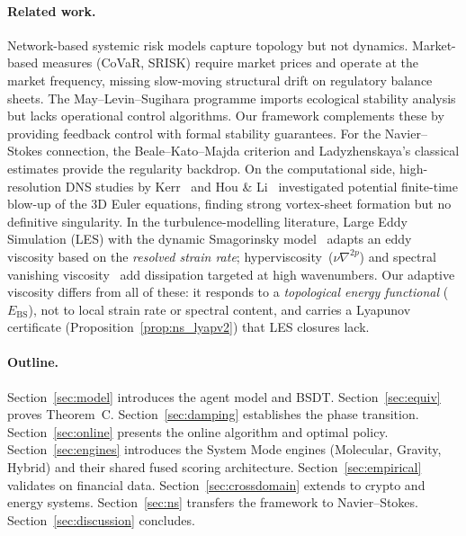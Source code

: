 \documentclass[final]{siamltex}
\begin{document}
\paragraph{Related work.}
Network-based systemic risk models
\cite{acemoglu2015systemic,elliott2014financial} capture topology
but not dynamics. Market-based measures (CoVaR, SRISK) require
market prices and operate at the market frequency, missing
slow-moving structural drift on regulatory balance sheets.
The May--Levin--Sugihara programme \cite{may2008complex} imports
ecological stability analysis but lacks operational control
algorithms. Our framework complements these by providing feedback
control with formal stability guarantees. For the Navier--Stokes
connection, the Beale--Kato--Majda criterion \cite{bkm1984} and
Ladyzhenskaya's classical estimates \cite{lady1969} provide the
regularity backdrop.  On the computational side, high-resolution
DNS studies by Kerr~\cite{kerr1993} and Hou \&
Li~\cite{houli2006} investigated potential finite-time blow-up of
the 3D Euler equations, finding strong vortex-sheet formation but
no definitive singularity.  In the turbulence-modelling
literature, Large Eddy Simulation (LES) with the dynamic
Smagorinsky model~\cite{smagorinsky1963,germano1991} adapts an
eddy viscosity based on the \emph{resolved strain rate};
hyperviscosity~($\nu\nabla^{2p}$) and spectral vanishing
viscosity~\cite{tadmor1989} add dissipation targeted at high
wavenumbers.  Our adaptive viscosity differs from all of these:
it responds to a \emph{topological energy functional}
($E_{\mathrm{BS}}$), not to local strain rate or spectral
content, and carries a Lyapunov certificate
(Proposition~\ref{prop:ns_lyapv2}) that LES closures lack.

\paragraph{Outline.}
Section~\ref{sec:model} introduces the agent model and BSDT.
Section~\ref{sec:equiv} proves Theorem~C. Section~\ref{sec:damping}
establishes the phase transition. Section~\ref{sec:online} presents
the online algorithm and optimal policy.
Section~\ref{sec:engines} introduces the System Mode engines
(Molecular, Gravity, Hybrid) and their shared fused scoring
architecture. Section~\ref{sec:empirical}
validates on financial data. Section~\ref{sec:crossdomain} extends
to crypto and energy systems. Section~\ref{sec:ns} transfers the
framework to Navier--Stokes. Section~\ref{sec:discussion}
concludes.


\end{document}
